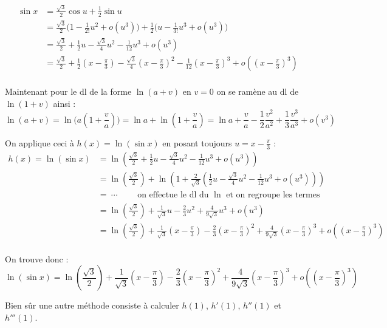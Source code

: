 {\begin{enumerate}
{\begin{align*}
\sin x 
  & = \frac{\sqrt3}{2}\cos u +\frac12\sin u \\
  & = \frac{\sqrt3}{2} \bigg(1-\frac{1}{2!}u^2 + o(u^3) \bigg) + \frac{1}{2} \bigg( u -\frac{1}{3!}u^3 + o(u^3) \bigg) \\
  & = \frac{\sqrt3}{2} + \frac{1}{2} u -  \frac{\sqrt3}{4} u^2 -\frac{1}{12}u^3 + o(u^3) \\
  & = \frac{\sqrt3}{2} + \frac{1}{2} (x-\frac\pi3) -  \frac{\sqrt3}{4}(x-\frac\pi3)^2 -\frac{1}{12}(x-\frac\pi3)^3 + o((x-\frac\pi3)^3) \\
\end{align*}


\bigskip

Maintenant pour le dl de la forme $\ln(a+v)$ en $v=0$ on se ramène au dl de $\ln(1+v)$ ainsi :
$$\ln(a+v)=\ln\big(a(1 + \frac v a)\big) = \ln a + \ln(1 + \frac v a)
= \ln a + \frac v a - \frac12 \frac{v^2}{a^2}  + \frac13 \frac{v^3}{a^3} + o(v^3)$$

On applique ceci à $h(x)= \ln(\sin x)$ en posant toujours $u=x-\frac\pi3$ :
\begin{align*}
h(x)= \ln(\sin x)
  & = \ln\left(\frac{\sqrt3}{2} + \frac{1}{2} u -  \frac{\sqrt3}{4} u^2 -\frac{1}{12}u^3 + o(u^3)\right) \\
  & = \ln\left(\frac{\sqrt3}{2}\right) + \ln\left(1 + \frac{2}{\sqrt3}\left(\frac{1}{2} u -  \frac{\sqrt3}{4} u^2 -\frac{1}{12}u^3 + o(u^3)\right) \right) \\
  & = \ \cdots \qquad \text{ on effectue le dl du } \ln \text{ et on regroupe les termes} \\
  & = \ln\left(\frac{\sqrt3}{2}\right) + \frac{1}{\sqrt 3} u -\frac23 u^2 + \frac{4}{9\sqrt3}u^3 + o(u^3) \\
  & = \ln\left(\frac{\sqrt3}{2}\right) + \frac{1}{\sqrt 3}(x-\frac\pi3)  -\frac23 (x-\frac\pi3)^2 + \frac{4}{9\sqrt3}(x-\frac\pi3)^3 + o((x-\frac\pi3)^3) \\
\end{align*}

On trouve donc :
$$\ln(\sin x) = \ln\left(\frac{\sqrt3}{2}\right) + \frac{1}{\sqrt 3}(x-\frac\pi3) 
 -\frac23 (x-\frac\pi3)^2 + \frac{4}{9\sqrt3}(x-\frac\pi3)^3 + o((x-\frac\pi3)^3)$$


\bigskip Bien sûr une autre méthode consiste à calculer $h(1)$, $h'(1)$, $h''(1)$ et $h'''(1)$.}
\end{enumerate}
}
